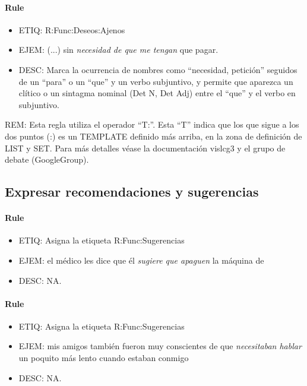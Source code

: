 \documentclass[11pt]{report}
\begin{document}
\paragraph*{Rule}
\begin{itemize}
\item ETIQ: R:Func:Deseos:Ajenos
\item EJEM: (...) sin \emph{necesidad de que me tengan} que pagar.
\item DESC: Marca la ocurrencia de nombres como ``necesidad, petición'' seguidos de un ``para'' o un ``que'' y un verbo subjuntivo, y permite que aparezca un clítico o un sintagma nominal (Det N, Det Adj) entre el ``que'' y el verbo en subjuntivo.
\end{itemize}

REM: Esta regla utiliza el operador ``T:''. Esta ``T'' indica que los que sigue a los dos puntos (:) es un TEMPLATE definido más arriba, en la zona de definición de LIST y SET. Para más detalles véase la documentación vislcg3 y el grupo de debate (GoogleGroup).
\subsection{Expresar recomendaciones y sugerencias}
\paragraph*{Rule}
\begin{itemize}
\item ETIQ: Asigna la etiqueta R:Func:Sugerencias
\item EJEM: el médico les dice que él \emph{sugiere que apaguen} la máquina de  
\item DESC: NA.
\end{itemize}

\paragraph*{Rule}
\begin{itemize}
\item ETIQ: Asigna la etiqueta R:Func:Sugerencias
\item EJEM: mis amigos también fueron muy conscientes de que \emph{necesitaban hablar} un poquito más lento cuando estaban conmigo 
\item DESC: NA.
\end{itemize}
\end{document}
